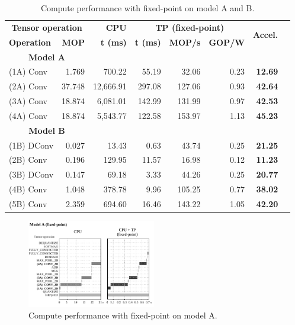 \begin{table}[!htp]\centering
	\caption{Compute performance with fixed-point on model A and B.}\label{tab:performance_fixed_point}
	\scriptsize
\begin{tabular}{lrrrrrrr}\toprule
	\multicolumn{2}{c}{\textbf{Tensor operation}} &\textbf{CPU} &\multicolumn{3}{c}{\textbf{TP (fixed-point)}} &\multirow{2}{*}{\textbf{Accel.}} \\\cmidrule{1-6}
	\textbf{Operation} &\textbf{MOP} &\textbf{t (ms)} &\textbf{t (ms)} &\textbf{MOP/s} &\textbf{GOP/W} & \\\midrule
	\multicolumn{2}{c}{\textbf{Model A}} & & & & & \\
	(1A) Conv &1.769 &700.22 &55.19 &32.06 &0.23 &\textbf{12.69} \\
	(2A) Conv &37.748 &12,666.91 &297.08 &127.06 &0.93 &\textbf{42.64} \\
	(3A) Conv &18.874 &6,081.01 &142.99 &131.99 &0.97 &\textbf{42.53} \\
	(4A) Conv &18.874 &5,543.77 &122.58 &153.97 &1.13 &\textbf{45.23} & \\\midrule
	\multicolumn{2}{c}{\textbf{Model B}} & & & & & \\
	(1B) DConv &0.027 &13.43 &0.63 &43.74 &0.25 &\textbf{21.25} \\
	(2B) Conv &0.196 &129.95 &11.57 &16.98 &0.12 &\textbf{11.23} \\
	(3B) DConv &0.147 &69.18 &3.33 &44.26 &0.25 &\textbf{20.77} \\
	(4B) Conv &1.048 &378.78 &9.96 &105.25 &0.77 &\textbf{38.02} \\
	(5B) Conv &2.359 &694.60 &16.46 &143.22 &1.05 &\textbf{42.20} \\
	\bottomrule
\end{tabular}
\end{table}

\begin{figure}[t!]
	\centering
	\includegraphics[width=0.5\textwidth]{../figures/sched_A_fixed_point.pdf}
	\caption{Compute performance with fixed-point on model A.}
	\label{fig:sched_model_a_fixed}
\end{figure}


